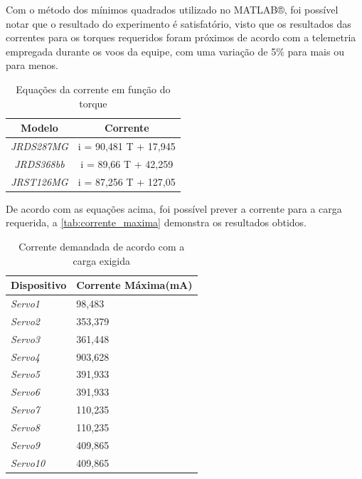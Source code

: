 Com o método dos mínimos quadrados utilizado no MATLAB®, foi possível notar que
o resultado do experimento é satisfatório, visto que os resultados das correntes para os torques
requeridos foram próximos de acordo com a telemetria empregada durante os voos da equipe,
com uma variação de 5\% para mais ou para menos.

\begin{table}[H]
\centering
\caption{Equações da corrente em função do torque}
\label{tab:equacoes}
\begin{tabular}{|c|c|}
\hline
\textbf{Modelo}    & \textbf{Corrente}       \\ \hline
\textit{JRDS287MG} & i = 90,481  T + 17,945 \\ \hline
\textit{JRDS368bb} & i = 89,66  T + 42,259  \\ \hline
\textit{JRST126MG} & i = 87,256  T + 127,05 \\ \hline
\end{tabular}
\end{table}

De acordo com as equações acima, foi possível prever a corrente para a carga requerida,
a \autoref{tab:corrente_maxima} demonstra os resultados obtidos.

\begin{table}[H]
\centering
\caption{Corrente demandada de acordo com a carga exigida}
\label{tab:corrente_maxima}
\begin{tabular}{|l|l|}
\hline
\textbf{Dispositivo} & \textbf{Corrente Máxima(mA)} \\ \hline
\textit{Servo1}      & 98,483                       \\ \hline
\textit{Servo2}      & 353,379                      \\ \hline
\textit{Servo3}      & 361,448                      \\ \hline
\textit{Servo4}      & 903,628                      \\ \hline
\textit{Servo5}      & 391,933                      \\ \hline
\textit{Servo6}      & 391,933                      \\ \hline
\textit{Servo7}      & 110,235                      \\ \hline
\textit{Servo8}      & 110,235                      \\ \hline
\textit{Servo9}      & 409,865                      \\ \hline
\textit{Servo10}     & 409,865                      \\ \hline
\end{tabular}
\end{table}

